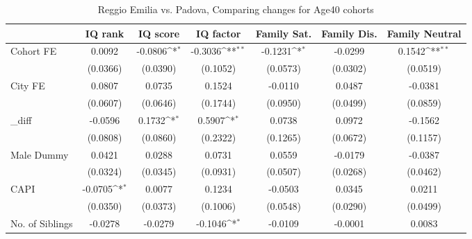 \begin{table}[htbp]\centering
\def\sym#1{\ifmmode^{#1}\else\(^{#1}\)\fi}
\caption{Reggio Emilia vs. Padova, Comparing changes for Age40 cohorts}
\begin{tabular}{l*{6}{c}}
\toprule
            &\multicolumn{1}{c}{IQ rank}&\multicolumn{1}{c}{IQ score}&\multicolumn{1}{c}{IQ factor}&\multicolumn{1}{c}{Family Sat.}&\multicolumn{1}{c}{Family Dis.}&\multicolumn{1}{c}{Family Neutral}\\
\midrule
Cohort FE   &      0.0092         &     -0.0806\sym{*}  &     -0.3036\sym{**} &     -0.1231\sym{*}  &     -0.0299         &      0.1542\sym{**} \\
            &    (0.0366)         &    (0.0390)         &    (0.1052)         &    (0.0573)         &    (0.0302)         &    (0.0519)         \\
\addlinespace
City FE     &      0.0807         &      0.0735         &      0.1524         &     -0.0110         &      0.0487         &     -0.0381         \\
            &    (0.0607)         &    (0.0646)         &    (0.1744)         &    (0.0950)         &    (0.0499)         &    (0.0859)         \\
\addlinespace
\_diff       &     -0.0596         &      0.1732\sym{*}  &      0.5907\sym{*}  &      0.0738         &      0.0972         &     -0.1562         \\
            &    (0.0808)         &    (0.0860)         &    (0.2322)         &    (0.1265)         &    (0.0672)         &    (0.1157)         \\
\addlinespace
Male Dummy  &      0.0421         &      0.0288         &      0.0731         &      0.0559         &     -0.0179         &     -0.0387         \\
            &    (0.0324)         &    (0.0345)         &    (0.0931)         &    (0.0507)         &    (0.0268)         &    (0.0462)         \\
\addlinespace
CAPI        &     -0.0705\sym{*}  &      0.0077         &      0.1234         &     -0.0503         &      0.0345         &      0.0211         \\
            &    (0.0350)         &    (0.0373)         &    (0.1006)         &    (0.0548)         &    (0.0290)         &    (0.0499)         \\
\addlinespace
No. of Siblings&     -0.0278         &     -0.0279         &     -0.1046\sym{*}  &     -0.0109         &     -0.0001         &      0.0083         \\

\end{tabular}
\end{table}
